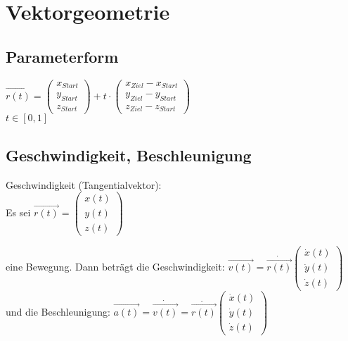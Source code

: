 



\chapter{Vektorgeometrie}

\section{Parameterform}
$\overrightarrow{r(t)}=
\begin{pmatrix}
 	x_{Start}\\
	y_{Start}\\
	z_{Start}
\end{pmatrix}
+
t\cdot
\begin{pmatrix}
 	x_{Ziel}-x_{Start}\\
	y_{Ziel}-y_{Start}\\
	z_{Ziel}-z_{Start}
\end{pmatrix}
$
\\
$t\in[0,1]$

\section{Geschwindigkeit, Beschleunigung}
Geschwindigkeit (Tangentialvektor):
\\
Es sei $\overrightarrow{r(t)}=
\begin{pmatrix}
 	x(t)\\
	y(t)\\
	z(t)
\end{pmatrix}$

eine Bewegung. Dann beträgt die Geschwindigkeit:
 $\overrightarrow{v(t)}=\dot{\overrightarrow{r(t)}}
\begin{pmatrix}
 	\dot{x}(t)\\
	\dot{y}(t)\\
	\dot{z}(t)
\end{pmatrix}$
und die Beschleunigung:
 $\overrightarrow{a(t)}=\dot{\overrightarrow{v(t)}}=\ddot{\overrightarrow{r(t)}}
\begin{pmatrix}
 	\dot{x}(t)\\
	\dot{y}(t)\\
	\dot{z}(t)
\end{pmatrix}$
\\

